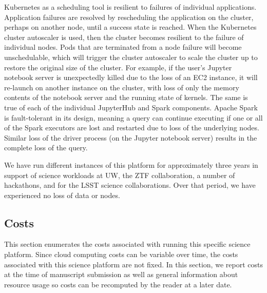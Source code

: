\documentclass[twocolumn, linenumbers]{aastex631}
\begin{document}
Kubernetes as a scheduling tool is resilient to failures of individual applications. Application failures are resolved by rescheduling the application on the cluster, perhaps on another node, until a success state is reached. When the Kubernetes cluster autoscaler is used, then the cluster becomes resilient to the failure of individual nodes. Pods that are terminated from a node failure will become unschedulable, which will trigger the cluster autoscaler to scale the cluster up to restore the original size of the cluster. For example, if the user's Jupyter notebook server is unexpectedly killed due to the loss of an EC2 instance, it will re-launch on another instance on the cluster, with loss of only the memory contents of the notebook server and the running state of kernels. The same is true of each of the individual JupyterHub and Spark components. Apache Spark is fault-tolerant in its design, meaning a query can continue executing if one or all of the Spark executors are lost and restarted due to loss of the underlying nodes. Similar loss of the driver process (on the Jupyter notebook server) results in the complete loss of the query.

We have run different instances of this platform for approximately three years in support of science workloads at UW, the ZTF collaboration, a number of hackathons, and for the LSST science collaborations. Over that period, we have experienced no loss of data or nodes.

\subsection{Costs}

This section enumerates the costs associated with running this specific science platform. Since cloud computing costs can be variable over time, the costs associated with this science platform are not fixed. In this section, we report costs at the time of manuscript submission as well as general information about resource usage so costs can be recomputed by the reader at a later date.
\end{document}
